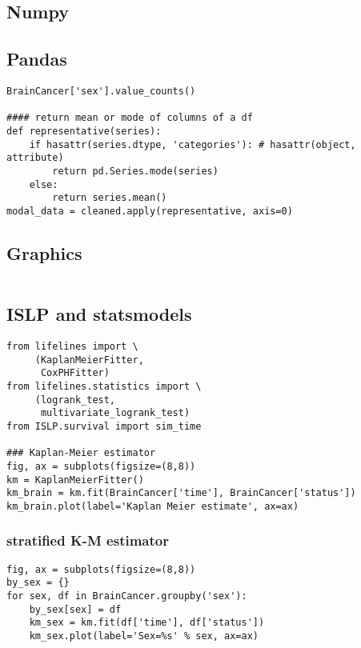 \documentclass[
  letterpaper,
  DIV=11,
  numbers=noendperiod]{scrreprt}
\begin{document}
\subsection{Numpy}\label{numpy-9}

\subsection{Pandas}\label{pandas-9}

\begin{verbatim}
BrainCancer['sex'].value_counts()

#### return mean or mode of columns of a df
def representative(series):
    if hasattr(series.dtype, 'categories'): # hasattr(object, attribute)
        return pd.Series.mode(series)
    else:
        return series.mean()
modal_data = cleaned.apply(representative, axis=0)

\end{verbatim}

\subsection{Graphics}\label{graphics-9}

\begin{verbatim}

\end{verbatim}

\subsection{ISLP and statsmodels}\label{islp-and-statsmodels-7}

\begin{verbatim}
from lifelines import \
     (KaplanMeierFitter,
      CoxPHFitter)
from lifelines.statistics import \
     (logrank_test,
      multivariate_logrank_test)
from ISLP.survival import sim_time

### Kaplan-Meier estimator
fig, ax = subplots(figsize=(8,8))
km = KaplanMeierFitter()
km_brain = km.fit(BrainCancer['time'], BrainCancer['status'])
km_brain.plot(label='Kaplan Meier estimate', ax=ax)
\end{verbatim}

\subsubsection{stratified K-M estimator}\label{stratified-k-m-estimator}

\begin{verbatim}
fig, ax = subplots(figsize=(8,8))
by_sex = {}
for sex, df in BrainCancer.groupby('sex'):
    by_sex[sex] = df
    km_sex = km.fit(df['time'], df['status'])
    km_sex.plot(label='Sex=%s' % sex, ax=ax)
\end{verbatim}
\end{document}
